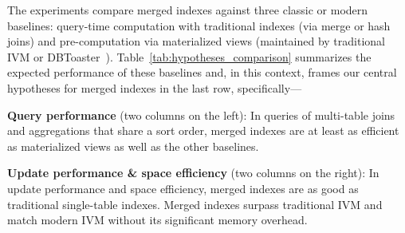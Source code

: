\documentclass[sigconf, pdfa, nonacm]{acmart}
\begin{document}
\begin{table}[htbp]
\centering
\caption{Experiment hypotheses. \textnormal{
    The experiments compare the final row against the baselines in the prior rows. They test the hypothesis that merged indexes match the best of all three baselines regarding query performance, update performance, and space efficiency.
}}\label{tab:hypotheses_comparison}
\small
{}
\end{table} %

The experiments compare merged indexes against three classic or modern baselines: query-time computation with traditional indexes (via merge or hash joins) and pre-computation via materialized views (maintained by traditional IVM or DBToaster~\cite{dbtoaster}). Table~\ref{tab:hypotheses_comparison} summarizes the expected performance of these baselines and, in this context, frames our central hypotheses for merged indexes in the last row, specifically---

\textbf{Query performance} (two columns on the left): In queries of multi-table joins and aggregations that share a sort order, merged indexes are at least as efficient as materialized views as well as the other baselines.

\textbf{Update performance \& space efficiency} (two columns on the right): In update performance and space efficiency, merged indexes are as good as traditional single-table indexes. Merged indexes surpass traditional IVM and match modern IVM without its significant memory overhead.
\end{document}
